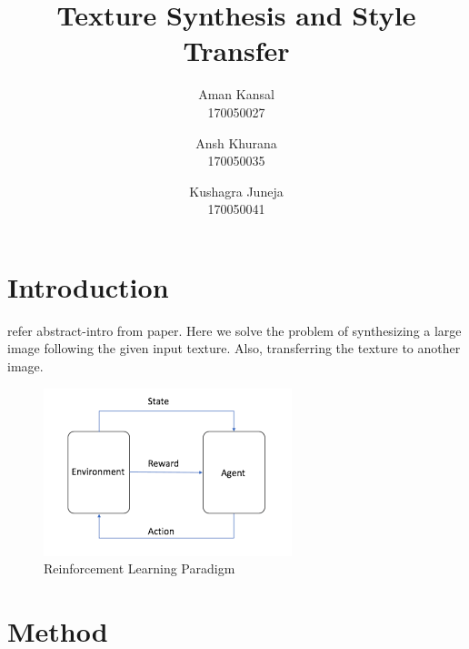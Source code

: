 \documentclass[10pt,twocolumn,letterpaper]{article}
\begin{document}
\title{Texture Synthesis and Style Transfer}

\author{Aman Kansal\\
170050027\\
\and
Ansh Khurana\\
170050035\\
\and
Kushagra Juneja\\
170050041
}

\maketitle

   

\section{Introduction}
refer abstract-intro from paper. Here we solve the problem of synthesizing a large image following the given input texture. Also, transferring the texture to another image.  
\begin{figure}[h]
\begin{center}
\includegraphics[scale=0.50]{resources/rl_general.png}
\end{center}
\vspace{-0.2em}
\caption{Reinforcement Learning Paradigm}
\label{fig:basic}
\end{figure}
\vspace{-6pt}
\section{Method}
\end{document}

